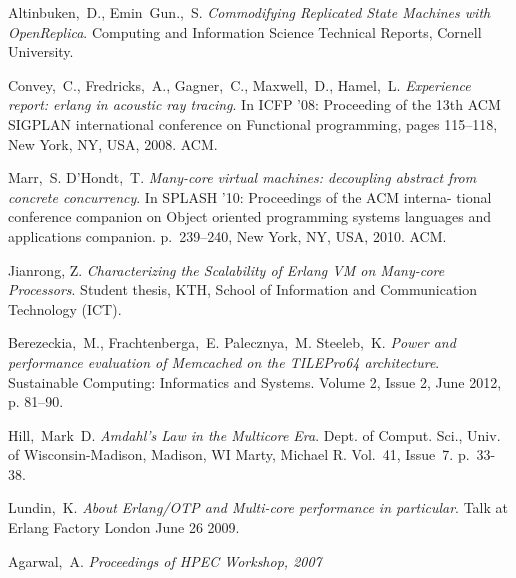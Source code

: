 \documentclass[english,11pt]{l4proj}
\begin{document}
\begin{thebibliography}{99}
     Altinbuken,~D., Emin~Gun.,~S. \emph{Commodifying
        Replicated State Machines with OpenReplica}. Computing and
        Information Science Technical Reports, Cornell University.

     Convey,~C., Fredricks,~A., Gagner,~C.,
        Maxwell,~D., Hamel,~L. \emph{Experience report: erlang in acoustic ray
        tracing}. In ICFP ’08: Proceeding of the 13th ACM SIGPLAN international
        conference on Functional programming, pages 115–118, New York, NY, USA,
        2008. ACM.

     Marr,~S. D’Hondt,~T. \emph{Many-core virtual machines:
        decoupling abstract from concrete concurrency}. In SPLASH ’10:
        Proceedings of the ACM interna- tional conference companion on Object
        oriented programming systems languages and applications companion.
        p.~239–240, New York, NY, USA, 2010. ACM.

     Jianrong, Z. \emph{Characterizing the
        Scalability of Erlang VM on Many-core Processors}. Student thesis, KTH,
        School of Information and Communication Technology (ICT).

     Berezeckia,~M., Frachtenberga,~E. Palecznya,~M.
        Steeleb,~K. \emph{Power and performance evaluation of Memcached on the
        TILEPro64 architecture}. Sustainable Computing: Informatics and Systems.
        Volume 2, Issue 2, June 2012, p. 81–90.

     Hill,~Mark~D. \emph{Amdahl's Law in the Multicore
        Era}. Dept. of Comput. Sci., Univ. of Wisconsin-Madison, Madison, WI
        Marty, Michael R.  Vol.~41, Issue~7. p.~33-38.

     Lundin,~K. \emph{About Erlang/OTP and Multi-core
        performance in particular}. Talk at Erlang Factory London June 26 2009.

     Agarwal,~A. \emph{Proceedings of HPEC Workshop,
    2007}

\end{thebibliography}

\educationalconsent
\end{document}
